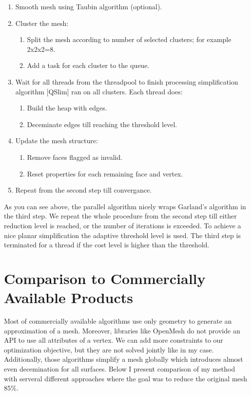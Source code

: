 \begin{enumerate}
\item Smooth mesh using Taubin algorithm (optional).
\item Cluster the mesh:
\begin{enumerate}
\item Split the mesh according to number of selected clusters; for example 2x2x2=8.
\item Add a task for each cluster to the queue.
\end{enumerate}
\item Wait for all threads from the threadpool to finish processing simplification algorithm [QSlim] ran on all clusters. Each thread does:
\begin{enumerate}
\item Build the heap with edges.
\item Deceminate edges till reaching the threshold level.
\end{enumerate}
\item Update the mesh structure:
\begin{enumerate}
\item Remove faces flagged as invalid.
\item Reset properties for each remaining face and vertex.
\end{enumerate}
\item Repeat from the second step till convergance.
\end{enumerate}

As you can see above, the parallel algorithm nicely wraps Garland's algorithm in the third step. We repeat the whole procedure from the second step till either reduction level is reached, or the number of iterations is exceeded. To achieve a nice planar simplification the adaptive threshold level is used. The third step is terminated for a thread if the cost level is higher than the threshold.

\newpage
\section{Comparison to Commercially Available Products}

Most of commercially available algorithms use only geometry to generate an approximation of a mesh. Moreover, libraries like OpenMesh do not provide an API to use all attributes of a vertex. We can add more constraints to our optimization objective, but they are not solved jointly like in my case. Additionally, those algorithms simplify a mesh globally which introduces almost even decemination for all surfaces. Below I present comparison of my method with serveral different approaches where the goal was to reduce the original mesh 85\%.

